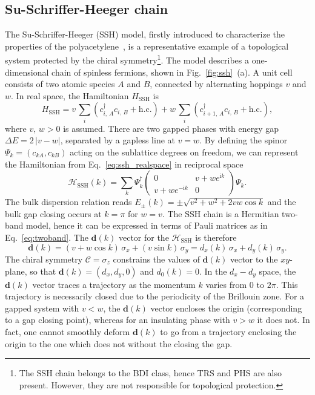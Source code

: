 \subsection{Su-Schriffer-Heeger chain}
\label{sub:ssh}
The Su-Schriffer-Heeger (SSH) model, firstly introduced to characterize the properties of the polyacetylene~\cite{SSH1976}, is a representative example of a topological system protected by the chiral symmetry\footnote{The SSH chain belongs to the BDI class, hence TRS and PHS are also present. However, they are not responsible for topological protection.}. The model describes a one-dimensional chain of spinless fermions, shown in Fig.~\ref{fig:ssh}~(a). A unit cell consists of two atomic species $A$ and $B$, connected by alternating hoppings $v$ and $w$. In real space, the Hamiltonian $H_{\mathrm{SSH}}$ is
\begin{equation}
H_{\mathrm{SSH}} =v \,  \sum_i  ( c_{i, \, A}^{\dagger} c_{i, \, B}  + \mathrm{h. c.})  +  w \,  \sum_i  ( c_{i + 1, \, A}^{\dagger} c_{i, \, B}  + \mathrm{h. c.} ),
\label{eq:ssh_realspace}
\end{equation}
where $v, \, w > 0 $ is assumed. There are two gapped phases with energy gap $\Delta E = 2 \, |v -w|$, separated by a gapless line at $v = w$. By defining the spinor $\Psi_k  = \left( c_{k A}, c_{k B} \right) $ acting on the sublattice degrees on freedom, we can represent the Hamiltonian from Eq.~\eqref{eq:ssh_realspace} in reciprocal space 
\begin{equation}
\mathcal{H}_{\mathrm{SSH}} (k) =  \sum_k  \Psi_k^{\dagger}  \begin{pmatrix}
0 & v + w e^{ \mathrm{i} k} \\
v + w e^{-\mathrm{i} k} & 0
\end{pmatrix}
\Psi_k.
\label{eq:ssh_bloch}
\end{equation}
The bulk dispersion relation reads $E_{\pm} (k) = \pm \sqrt{v^2 + w^2 + 2 v w \cos k}$ and the bulk gap closing occurs at $k = \pi$ for $w = v$. The SSH chain is a Hermitian two-band model, hence it can be expressed in terms of Pauli matrices as in Eq.~\eqref{eq:twoband}. The $\mathbf{d} (k)$ vector for the $\mathcal{H}_{\mathrm{SSH}}$ is therefore
\begin{equation}
\mathbf{d} (k) = \left( v + w \cos k \right) \, \sigma_x + \left( v \sin k \right) \, \sigma_y = d_x(k) \, \sigma_x  + d_y (k) \, \sigma_y.
\label{eq:ssh_pauli}
\end{equation}
The chiral symmetry $\mathcal{C} = \sigma_z$ constrains the values of $\mathbf{d} (k)$ vector to the $xy$-plane, so that $\mathbf{d} (k) = (d_x, d_y, 0)$ and $d_0 (k) = 0$. In the $d_x - d_y$ space, the $\mathbf{d} (k)$ vector traces a trajectory as the momentum $k$ varies from $0$ to $2 \pi$. This trajectory is necessarily closed due to the periodicity of the Brillouin zone. For a gapped system with $v < w$, the $\mathbf{d} (k)$ vector encloses the origin (corresponding to a gap closing point), whereas for an insulating phase with $v > w$ it does not. In fact, one cannot smoothly deform $\mathbf{d}(k)$ to go from a trajectory enclosing the origin to the one which does not without the closing the gap. 

